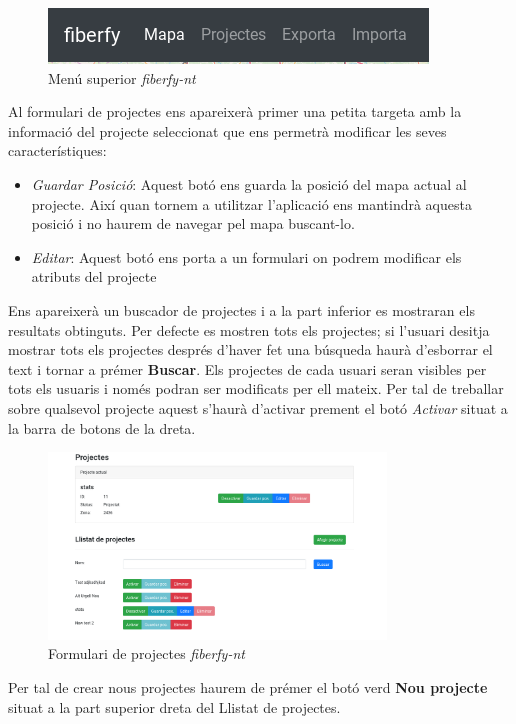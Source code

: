 \documentclass[a4paper]{article}
\begin{document}
	\begin{figure}[H]
		\centering
		\includegraphics{images/topbar_menu_1.png}
		\caption{Menú superior \emph{fiberfy-nt}}
	\end{figure}
	Al formulari de projectes ens apareixerà primer una petita targeta amb la informació del projecte seleccionat que ens permetrà modificar les seves característiques:
	\begin{itemize}
		\item \emph{Guardar Posició}: Aquest botó ens guarda la posició del mapa actual al projecte. Així quan tornem a utilitzar l'aplicació ens mantindrà aquesta posició i no haurem de navegar pel mapa buscant-lo.
		\item \emph{Editar}: Aquest botó ens porta a un formulari on podrem modificar els atributs del projecte
	\end{itemize}
	Ens apareixerà un buscador de projectes i a la part inferior es mostraran els resultats obtinguts. Per defecte es mostren tots els projectes; si l'usuari desitja mostrar tots els projectes després d'haver fet una búsqueda haurà d'esborrar el text i tornar a prémer \textbf{Buscar}.
	Els projectes de cada usuari seran visibles per tots els usuaris i només podran ser modificats per ell mateix. Per tal de treballar sobre qualsevol projecte aquest s'haurà d'activar prement el botó \emph{Activar} situat a la barra de botons de la dreta.
	
	\begin{figure}[H]
		\centering
		\includegraphics[width=0.8\textwidth]{images/projects_form.png}
		\caption{Formulari de projectes \emph{fiberfy-nt}}
	\end{figure}

	Per tal de crear nous projectes haurem de prémer el botó verd \textbf{Nou projecte} situat a la part superior dreta del Llistat de projectes.
	
\end{document}

